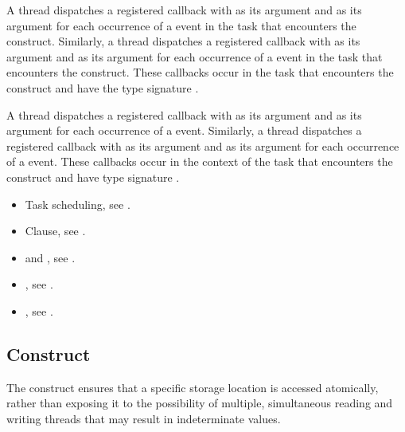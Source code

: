 A thread dispatches a registered 
callback with  as its  argument
and  as its  argument for each
occurrence of a  event in the task that encounters
the  construct. Similarly, a thread dispatches a registered
 callback with 
as its  argument and  as its 
argument for each  occurrence of a  event in the task that
encounters the  construct. These callbacks occur in the task that
encounters the  construct and have the type signature
.

A thread dispatches a registered  callback
with  as its  argument and
 as its  argument for each occurrence of
a  event. Similarly, a thread dispatches a registered
 callback with 
as its  argument and  as its  argument
for each occurrence of a  event. These callbacks occur in the
context of the task that encounters the  construct and have type
signature .

\crossreferences
\begin{itemize}
\item Task scheduling, see
.

\item {} Clause, see .

\item {} and , see
.

\item {}, see
.

\item {}, see
.
\end{itemize}



\subsection{ Construct}
\label{subsec:atomic Construct}
\summary
The  construct ensures that a specific storage location is accessed 
atomically, rather than exposing it to the possibility of multiple, simultaneous 
reading and writing threads that may result in indeterminate values.

